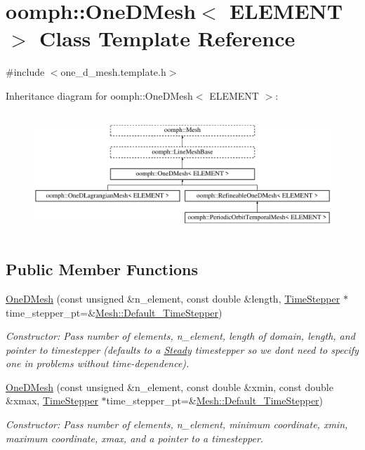 \hypertarget{classoomph_1_1OneDMesh}{}\section{oomph\+:\+:One\+D\+Mesh$<$ E\+L\+E\+M\+E\+NT $>$ Class Template Reference}
\label{classoomph_1_1OneDMesh}


{\ttfamily \#include $<$one\+\_\+d\+\_\+mesh.\+template.\+h$>$}

Inheritance diagram for oomph\+:\+:One\+D\+Mesh$<$ E\+L\+E\+M\+E\+NT $>$\+:\begin{figure}[H]
\begin{center}
\leavevmode
\includegraphics[height=4.620462cm]{classoomph_1_1OneDMesh}
\end{center}
\end{figure}
\subsection*{Public Member Functions}
\begin{DoxyCompactItemize}
\item 
\hyperlink{classoomph_1_1OneDMesh_ac6962f5c0184d302544253e3b4407c48}{One\+D\+Mesh} (const unsigned \&n\+\_\+element, const double \&length, \hyperlink{classoomph_1_1TimeStepper}{Time\+Stepper} $\ast$time\+\_\+stepper\+\_\+pt=\&\hyperlink{classoomph_1_1Mesh_a12243d0fee2b1fcee729ee5a4777ea10}{Mesh\+::\+Default\+\_\+\+Time\+Stepper})
\begin{DoxyCompactList}\small\item\em Constructor\+: Pass number of elements, n\+\_\+element, length of domain, length, and pointer to timestepper (defaults to a \hyperlink{classoomph_1_1Steady}{Steady} timestepper so we don\textquotesingle{}t need to specify one in problems without time-\/dependence). \end{DoxyCompactList}\item 
\hyperlink{classoomph_1_1OneDMesh_a1a8b9e65226f10dfbb48fe2362e83014}{One\+D\+Mesh} (const unsigned \&n\+\_\+element, const double \&xmin, const double \&xmax, \hyperlink{classoomph_1_1TimeStepper}{Time\+Stepper} $\ast$time\+\_\+stepper\+\_\+pt=\&\hyperlink{classoomph_1_1Mesh_a12243d0fee2b1fcee729ee5a4777ea10}{Mesh\+::\+Default\+\_\+\+Time\+Stepper})
\begin{DoxyCompactList}\small\item\em Constructor\+: Pass number of elements, n\+\_\+element, minimum coordinate, xmin, maximum coordinate, xmax, and a pointer to a timestepper. \end{DoxyCompactList}\end{DoxyCompactItemize}
